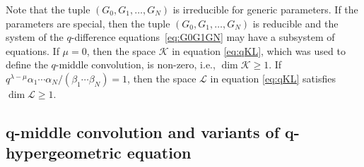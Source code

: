 \documentclass[pdftex]{sigma}
\numberwithin{equation}{section}
\theoremstyle{definition}
\begin{document}
Note that the tuple $(G_0, G_1, \dots , G_N )$ is irreducible for generic parameters.
If the parameters are special, then the tuple $(G_0, G_1, \dots , G_N )$ is reducible and the system of the $q$-difference equations~\eqref{eq:G0G1GN} may have a subsystem of equations.
If $\mu =0$, then the space $\mathcal{K} $ in equation \eqref{eq:qKL}, which was used to define the $q$-middle convolution, is non-zero, i.e., $\dim \mathcal{K} \geq 1$.
If~${q ^{\lambda -\mu } \alpha _1 \cdots \alpha _N / (\beta _1 \cdots \beta _N) =1}$, then the space $\mathcal{L} $ in equation \eqref{eq:qKL} satisfies $\dim \mathcal{L} \geq 1$.

\subsection[q-middle convolution and variants of q-hypergeometric equation]{$\boldsymbol{q}$-middle convolution and variants of $\boldsymbol{q}$-hypergeometric equation} \label{sec:qconvex}
\end{document}

